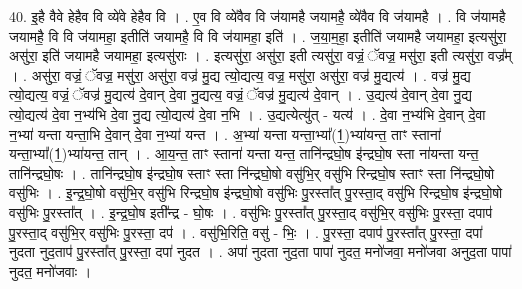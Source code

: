 \documentclass[17pt]{extarticle}
\begin{document}
40. इ॒है वैवे हेहैव वि व्ये॑वे हेहैव वि । . ए॒व वि व्ये॑वैव वि ज॑यामहै जयामहै॒ व्ये॑वैव वि ज॑यामहै । . वि ज॑यामहै जयामहै॒ वि वि ज॑यामहा॒ इतीति॑ जयामहै॒ वि वि ज॑यामहा॒ इति॑ । . ज॒या॒म॒हा॒ इतीति॑ जयामहै जयामहा॒ इत्यसु॑रा॒ असु॑रा॒ इति॑ जयामहै जयामहा॒ इत्यसु॑राः । . इत्यसु॑रा॒ असु॑रा॒ इती त्यसु॑रा॒ वज्रं॒ ॅवज्र॒ मसु॑रा॒ इती त्यसु॑रा॒ वज्र᳚म् । . असु॑रा॒ वज्रं॒ ॅवज्र॒ मसु॑रा॒ असु॑रा॒ वज्र॑ मु॒द्य त्यो॒द्यत्य॒ वज्र॒ मसु॑रा॒ असु॑रा॒ वज्र॑ मु॒द्यत्य॑ । . वज्र॑ मु॒द्य त्यो॒द्यत्य॒ वज्रं॒ ॅवज्र॑ मु॒द्यत्य॑ दे॒वान् दे॒वा नु॒द्यत्य॒ वज्रं॒ ॅवज्र॑ मु॒द्यत्य॑ दे॒वान् । . उ॒द्यत्य॑ दे॒वान् दे॒वा नु॒द्य त्यो॒द्यत्य॑ दे॒वा न॒भ्य॑भि दे॒वा नु॒द्य त्यो॒द्यत्य॑ दे॒वा न॒भि । . उ॒द्यत्येत्यु॑त् - यत्य॑ । . दे॒वा न॒भ्य॑भि दे॒वान् दे॒वा न॒भ्या॑ यन्ता यन्ता॒भि दे॒वान् दे॒वा न॒भ्या॑ यन्त । . अ॒भ्या॑ यन्ता यन्ता॒भ्या᳚(1॒)भ्या॑यन्त॒ ताꣳ स्ताना॑ यन्ता॒भ्या᳚(1॒)भ्या॑यन्त॒ तान् । . आ॒य॒न्त॒ ताꣳ स्ताना॑ यन्ता यन्त॒ तानि॑न्द्रघो॒ष इ॑न्द्रघो॒ष स्ता ना॑यन्ता यन्त॒ तानि॑न्द्रघो॒षः । . तानि॑न्द्रघो॒ष इ॑न्द्रघो॒ष स्ताꣳ स्ता नि॑न्द्रघो॒षो वसु॑भि॒र् वसु॑भि रिन्द्रघो॒ष स्ताꣳ स्ता नि॑न्द्रघो॒षो वसु॑भिः । . इ॒न्द्र॒घो॒षो वसु॑भि॒र् वसु॑भि रिन्द्रघो॒ष इ॑न्द्रघो॒षो वसु॑भिः पु॒रस्ता᳚त् पु॒रस्ता॒द् वसु॑भि रिन्द्रघो॒ष इ॑न्द्रघो॒षो वसु॑भिः पु॒रस्ता᳚त् । . इ॒न्द्र॒घो॒ष इती᳚न्द्र - घो॒षः । . वसु॑भिः पु॒रस्ता᳚त् पु॒रस्ता॒द् वसु॑भि॒र् वसु॑भिः पु॒रस्ता॒ दपाप॑ पु॒रस्ता॒द् वसु॑भि॒र् वसु॑भिः पु॒रस्ता॒ दप॑ । . वसु॑भि॒रिति॒ वसु॑ - भिः॒ । . पु॒रस्ता॒ दपाप॑ पु॒रस्ता᳚त् पु॒रस्ता॒ दपा॑ नुदता नुद॒ताप॑ पु॒रस्ता᳚त् पु॒रस्ता॒ दपा॑ नुदत । . अपा॑ नुदता नुद॒ता पापा॑ नुदत॒ मनो॑जवा॒ मनो॑जवा अनुद॒ता पापा॑ नुदत॒ मनो॑जवाः । \newline
\pagebreak
{}
\end{document}
